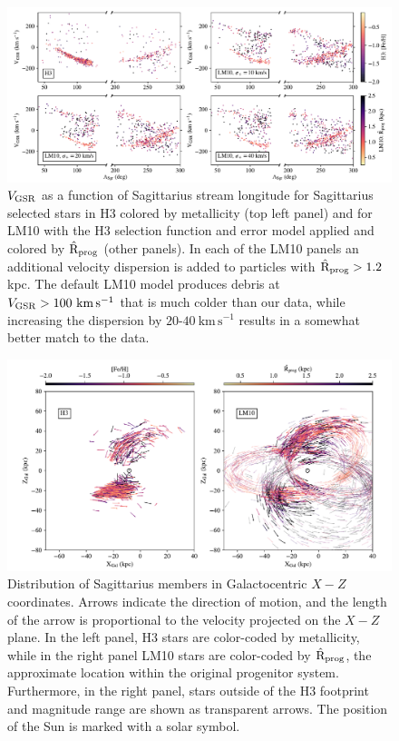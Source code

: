 \documentclass[twocolumn,tighten,twocolappendix]{aastex63}
\newcommand{\sgr}{Sagittarius}
\newcommand{\kms}{\mathrm{km} \, \mathrm{s}^{-1}}
\newcommand{\Vgsr}{V_{\rm GSR}}
\begin{document}
\begin{CJK*}{UTF8}{gbsn}
\begin{figure}[!t]
\includegraphics[width=\textwidth]{extra_sigma.pdf}
\caption{ $\Vgsr$ as a function of \sgr{} stream longitude for \sgr{} selected stars in H3 colored by metallicity (top left panel) and for LM10 with the H3 selection function and error model applied and colored by $\hat{\rm R}_{\rm prog}$ (other panels).  In each of the LM10 panels an additional velocity dispersion is added to particles with $\hat{\rm R}_{\rm prog}>1.2$ kpc.  The default LM10 model produces debris at $\Vgsr>100\ \kms$ that is much colder than our data, while increasing the dispersion by $20$-$40\ \kms$ results in a somewhat better match to the data.
\label{fig:extra_sigma}}
\end{figure}


\begin{figure}
\includegraphics[width=\textwidth]{quiver.pdf}
\caption{Distribution of \sgr{} members in Galactocentric $X-Z$ coordinates.  Arrows indicate the direction of motion, and the length of the arrow is proportional to the velocity projected on the $X-Z$ plane.  In the left panel, H3 stars are color-coded by metallicity, while in the right panel LM10 stars are color-coded by $\hat{\rm R}_{\rm prog}$, the approximate location within the original progenitor system.  Furthermore, in the right panel, stars outside of the H3 footprint and magnitude range are shown as transparent arrows.  The position of the Sun is marked with a solar symbol.
\label{fig:quiver}}
\end{figure}


\end{CJK*}
\end{document}
